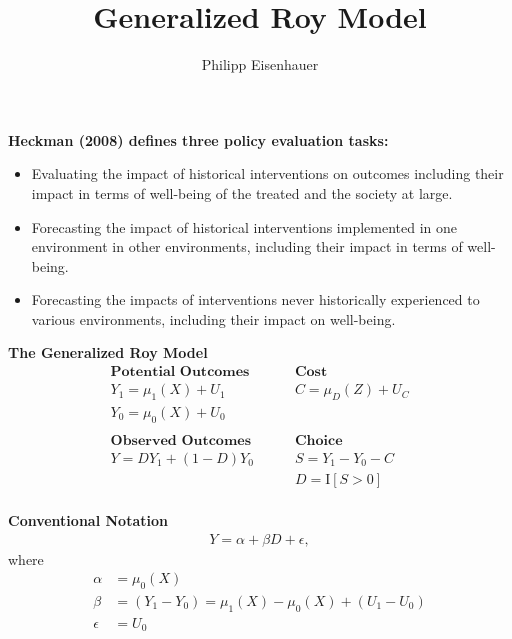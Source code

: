 


\title{Generalized Roy Model}
\author{Philipp Eisenhauer}
\date{}
\let\otp\titlepage


      


\begin{frame}
\maketitle
\end{frame}


\begin{frame}
\textbf{Heckman (2008) defines three policy evaluation tasks:}
\begin{itemize}
\item Evaluating the impact of historical interventions on outcomes including their impact in terms of well-being of the treated and the  society at large.
\item Forecasting the impact of historical interventions implemented in one environment in other environments, including their impact in terms of well-being.
\item Forecasting the impacts of interventions never historically experienced to various environments, including their impact on well-being.
\end{itemize}
\end{frame}


\begin{frame}
\textbf{The Generalized Roy Model}
\begin{align*}
\textbf{Potential Outcomes} &\qquad \textbf{Cost} \\
Y_1 = \mu_1(X) + U_1      &\qquad C = \mu_D(Z) + U_C \\
Y_0 = \mu_0(X) + U_0      &\qquad \\
    & \\
\textbf{Observed Outcomes } &\qquad \textbf{Choice} \\
Y = D Y_1 + (1 - D)Y_0 &\qquad S = Y_1 - Y_0 - C \\
                       &\qquad D = \mathrm{I}[S > 0] \\
\end{align*}
\end{frame}


\begin{frame}
\textbf{Conventional Notation}
\begin{align*}
Y = \alpha + \beta D + \epsilon,
\end{align*}
where
\begin{align*}
\alpha &= \mu_0(X)  \\
\beta  & = (Y_1 - Y_0) =\mu_1(X) - \mu_0(X)  + (U_1 - U_0)\\
\epsilon & =U_0
\end{align*}
\end{frame}


